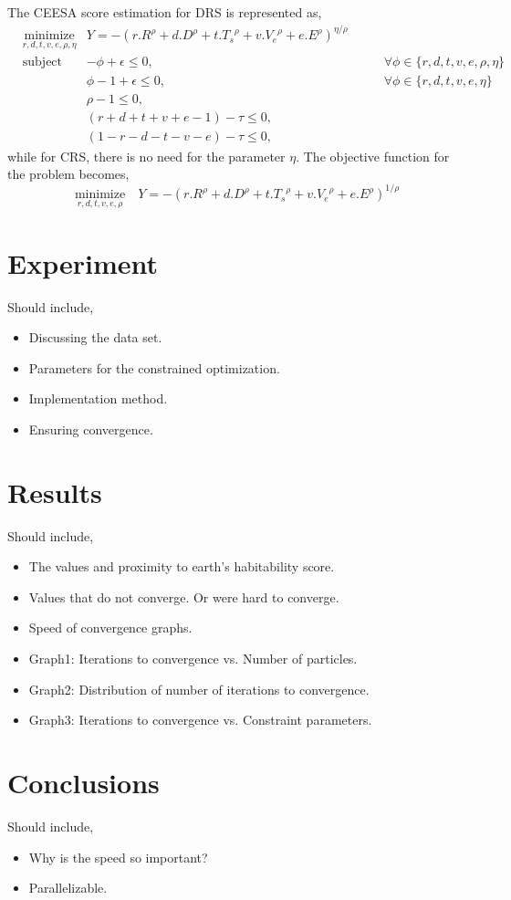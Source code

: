 \documentclass[10pt]{article}
\newenvironment{pointers}{%
  \noindent Should include,
  \begin{itemize}
    \setlength{\itemsep}{-1pt}}{%
\end{itemize}}
\begin{document}
The CEESA score estimation for DRS is represented as,
\begin{equation*}
  \begin{aligned}
    & \underset{r,d,t,v,e,\rho,\eta}{\text{minimize}}
    & Y = {-}{(r.R^\rho+d.D^\rho+t.{T_s}^\rho+v.{V_e}^\rho+e.E^\rho)}^{\eta/\rho}\\
    & \text{subject to}
    &  {-}\phi + \epsilon \leq 0, &\quad\quad \forall \phi\in\{r,d,t,v,e,\rho,\eta\}\\
    && \phi - 1 + \epsilon \leq 0, &\quad\quad \forall \phi\in\{r,d,t,v,e,\eta\}\\
    && \rho - 1 \leq 0,\\
    && (r+d+t+v+e-1) - \tau \leq 0,\\
    && (1-r-d-t-v-e) - \tau \leq 0,
  \end{aligned}
\end{equation*}
while for CRS, there is no need for the parameter $\eta$. The objective function for the problem becomes,
\begin{equation*}
  \underset{r,d,t,v,e,\rho}{\text{minimize}}\quad
  Y = {-}{(r.R^\rho+d.D^\rho+t.{T_s}^\rho+v.{V_e}^\rho+e.E^\rho)}^{1/\rho}
\end{equation*}

\section{Experiment}
\begin{pointers}
\item Discussing the data set.
\item Parameters for the constrained optimization.
\item Implementation method.
\item Ensuring convergence.
\end{pointers}


\section{Results}
\begin{pointers}
\item The values and proximity to earth's habitability score.
\item Values that do not converge. Or were hard to converge.
\item Speed of convergence graphs.
\item Graph1: Iterations to convergence vs. Number of particles.
\item Graph2: Distribution of number of iterations to convergence.
\item Graph3: Iterations to convergence vs. Constraint parameters.
\end{pointers}


\section{Conclusions}
\begin{pointers}
\item Why is the speed so important?
\item Parallelizable.
\end{pointers}
\end{document}
